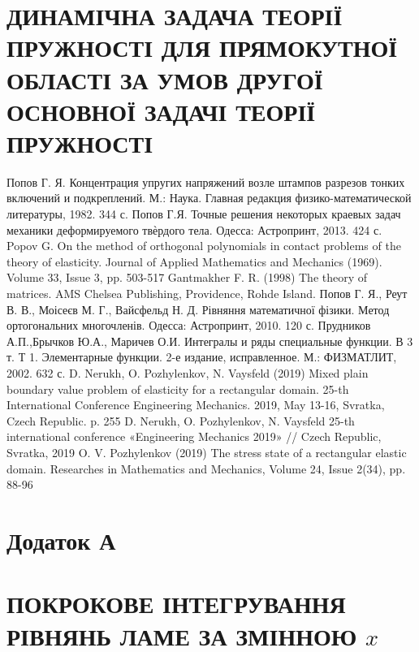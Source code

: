 \documentclass[a4paper,14pt]{extarticle}
\numberwithin{equation}{section}
\begin{document}
\section{ДИНАМІЧНА ЗАДАЧА ТЕОРІЇ ПРУЖНОСТІ ДЛЯ ПРЯМОКУТНОЇ ОБЛАСТІ
ЗА УМОВ ДРУГОЇ ОСНОВНОЇ ЗАДАЧІ ТЕОРІЇ ПРУЖНОСТІ}

\newpage

\begin{thebibliography}{1}
    Попов Г. Я. Концентрация упругих напряжений возле штампов разрезов тонких включений и подкреплений. М.: Наука. Главная редакция физико-математической литературы, 1982. 344 с.
    Попов Г.Я. Точные решения некоторых краевых задач механики деформируемого твѐрдого тела. Одесса: Астропринт, 2013. 424 с.
    Popov G. On the method of orthogonal polynomials in contact problems of the theory of elasticity. Journal of Applied Mathematics and Mechanics (1969). Volume 33, Issue 3, pp. 503-517
    Gantmakher F. R. (1998) The theory of matrices. AMS Chelsea Publishing, Providence, Rohde Island.
    Попов Г. Я., Реут В. В., Моісеєв М. Г., Вайсфельд Н. Д. Рівняння математичної фізики. Метод ортогональних многочленів. Одесса: Астропринт, 2010. 120 с.
    Прудников А.П.,Брычков Ю.А., Маричев О.И. Интегралы и ряды специальные функции. В 3 т. Т 1. Элементарные функции. 2-е издание, исправленное. М.: ФИЗМАТЛИТ, 2002. 632 с.
    D. Nerukh, O. Pozhylenkov, N. Vaysfeld (2019) Mixed plain boundary value problem of elasticity for a rectangular domain. 25-th International Conference Engineering Mechanics. 2019, May 13-16, Svratka, Czech Republic. p. 255
    D. Nerukh, O. Pozhylenkov, N. Vaysfeld 25-th international conference «Engineering Mechanics 2019» // Czech Republic, Svratka, 2019
    O. V. Pozhylenkov (2019) The stress state of a rectangular elastic domain. Researches in Mathematics and Mechanics, Volume 24, Issue 2(34), pp. 88-96
\end{thebibliography}

\section*{\centering Додаток А}\label{ap_A}
\section*{\centering ПОКРОКОВЕ ІНТЕГРУВАННЯ РІВНЯНЬ ЛАМЕ ЗА ЗМІННОЮ $x$}

\end{document}
